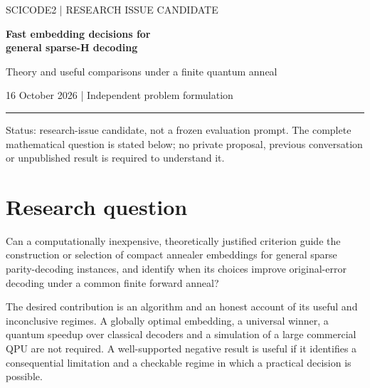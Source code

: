 \documentclass[11pt,letterpaper]{article}
\begin{document}
\thispagestyle{plain}
{\color{accent}\small\sffamily SCICODE2 | RESEARCH ISSUE CANDIDATE}\par\vspace{8pt}
{\LARGE\bfseries Fast embedding decisions for\\[2pt] general sparse-H decoding}\par\vspace{5pt}
{\large Theory and useful comparisons under a finite quantum anneal}\par\vspace{5pt}
{\small 16 October 2026 | Independent problem formulation}\par\vspace{7pt}
{\color{accent}\hrule}\vspace{10pt}
Status: research-issue candidate, not a frozen evaluation prompt. The complete mathematical question is stated below; no private proposal, previous conversation or unpublished result is required to understand it.\par
\section{Research question}
Can a computationally inexpensive, theoretically justified criterion guide the construction or selection of compact annealer embeddings for general sparse parity-decoding instances, and identify when its choices improve original-error decoding under a common finite forward anneal?\par
The desired contribution is an algorithm and an honest account of its useful and inconclusive regimes. A globally optimal embedding, a universal winner, a quantum speedup over classical decoders and a simulation of a large commercial QPU are not required. A well-supported negative result is useful if it identifies a consequential limitation and a checkable regime in which a practical decision is possible.\par
\end{document}

